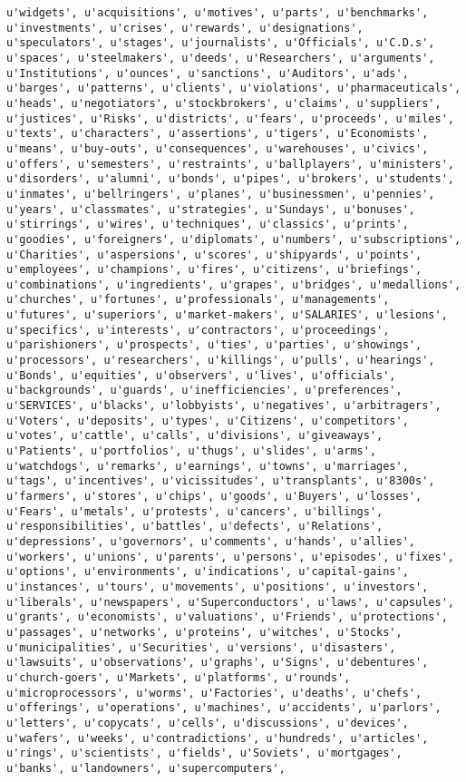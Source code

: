 \documentclass{article}
\begin{document}
\begin{Verbatim}[commandchars=\\\{\}]
u'widgets', u'acquisitions', u'motives', u'parts', u'benchmarks', u'investments', u'crises', u'rewards', u'designations', u'speculators', u'stages', u'journalists', u'Officials', u'C.D.s', u'spaces', u'steelmakers', u'deeds', u'Researchers', u'arguments', u'Institutions', u'ounces', u'sanctions', u'Auditors', u'ads', u'barges', u'patterns', u'clients', u'violations', u'pharmaceuticals', u'heads', u'negotiators', u'stockbrokers', u'claims', u'suppliers', u'justices', u'Risks', u'districts', u'fears', u'proceeds', u'miles', u'texts', u'characters', u'assertions', u'tigers', u'Economists', u'means', u'buy-outs', u'consequences', u'warehouses', u'civics', u'offers', u'semesters', u'restraints', u'ballplayers', u'ministers', u'disorders', u'alumni', u'bonds', u'pipes', u'brokers', u'students', u'inmates', u'bellringers', u'planes', u'businessmen', u'pennies', u'years', u'classmates', u'strategies', u'Sundays', u'bonuses', u'stirrings', u'wires', u'techniques', u'classics', u'prints', u'goodies', u'foreigners', u'diplomats', u'numbers', u'subscriptions', u'Charities', u'aspersions', u'scores', u'shipyards', u'points', u'employees', u'champions', u'fires', u'citizens', u'briefings', u'combinations', u'ingredients', u'grapes', u'bridges', u'medallions', u'churches', u'fortunes', u'professionals', u'managements', u'futures', u'superiors', u'market-makers', u'SALARIES', u'lesions', u'specifics', u'interests', u'contractors', u'proceedings', u'parishioners', u'prospects', u'ties', u'parties', u'showings', u'processors', u'researchers', u'killings', u'pulls', u'hearings', u'Bonds', u'equities', u'observers', u'lives', u'officials', u'backgrounds', u'guards', u'inefficiencies', u'preferences', u'SERVICES', u'blacks', u'lobbyists', u'negatives', u'arbitragers', u'Voters', u'deposits', u'types', u'Citizens', u'competitors', u'votes', u'cattle', u'calls', u'divisions', u'giveaways', u'Patients', u'portfolios', u'thugs', u'slides', u'arms', u'watchdogs', u'remarks', u'earnings', u'towns', u'marriages', u'tags', u'incentives', u'vicissitudes', u'transplants', u'8300s', u'farmers', u'stores', u'chips', u'goods', u'Buyers', u'losses', u'Fears', u'metals', u'protests', u'cancers', u'billings', u'responsibilities', u'battles', u'defects', u'Relations', u'depressions', u'governors', u'comments', u'hands', u'allies', u'workers', u'unions', u'parents', u'persons', u'episodes', u'fixes', u'options', u'environments', u'indications', u'capital-gains', u'instances', u'tours', u'movements', u'positions', u'investors', u'liberals', u'newspapers', u'Superconductors', u'laws', u'capsules', u'grants', u'economists', u'valuations', u'Friends', u'protections', u'passages', u'networks', u'proteins', u'witches', u'Stocks', u'municipalities', u'Securities', u'versions', u'disasters', u'lawsuits', u'observations', u'graphs', u'Signs', u'debentures', u'church-goers', u'Markets', u'platforms', u'rounds', u'microprocessors', u'worms', u'Factories', u'deaths', u'chefs', u'offerings', u'operations', u'machines', u'accidents', u'parlors', u'letters', u'copycats', u'cells', u'discussions', u'devices', u'wafers', u'weeks', u'contradictions', u'hundreds', u'articles', u'rings', u'scientists', u'fields', u'Soviets', u'mortgages', u'banks', u'landowners', u'supercomputers', 
\end{Verbatim}
\end{document}
